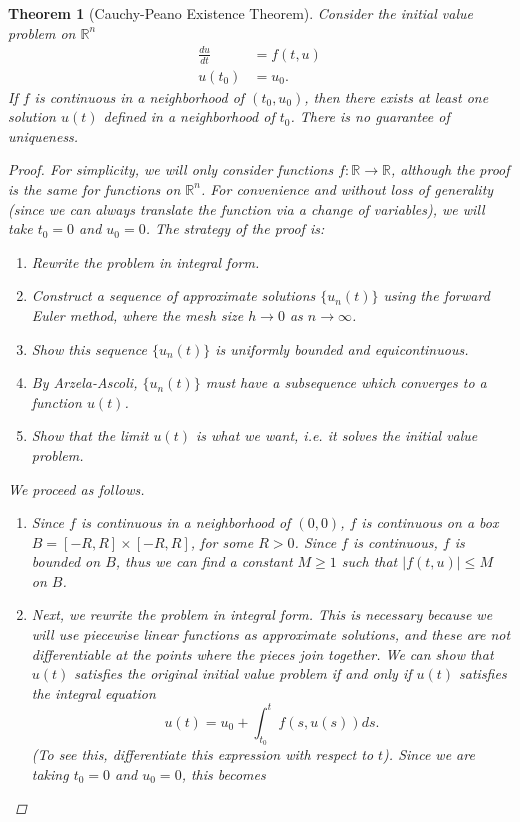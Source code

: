 \documentclass[12pt]{amsart}         %
\newtheorem{theorem}{Theorem}[section]
\theoremstyle{remark}
\newcommand{\R}{\mathbb{R}}
\begin{document}
\begin{theorem}[Cauchy-Peano Existence Theorem]
Consider the initial value problem on $\R^n$
\begin{align*}
\frac{du}{dt} &= f(t, u) \\
u(t_0) &= u_0.
\end{align*}
If $f$ is continuous in a neighborhood of $(t_0, u_0)$, then there exists at least one solution $u(t)$ defined in a neighborhood of $t_0$. There is no guarantee of uniqueness.
\begin{proof}
For simplicity, we will only consider functions $f: \R \rightarrow \R$, although the proof is the same for functions on $\R^n$. For convenience and without loss of generality (since we can always translate the function via a change of variables), we will take $t_0 = 0$ and $u_0 = 0$. The strategy of the proof is:
\begin{enumerate}
    \item Rewrite the problem in integral form.
	\item Construct a sequence of approximate solutions $\{ u_n(t) \}$ using the forward Euler method, where the mesh size $h \rightarrow 0$ as $n \rightarrow \infty$.
	\item Show this sequence $\{ u_n(t) \}$ is uniformly bounded and equicontinuous.
	\item By Arzela-Ascoli, $\{ u_n(t) \}$ must have a subsequence which converges to a function $u(t)$.
	\item Show that the limit $u(t)$ is what we want, i.e. it solves the initial value problem.
\end{enumerate}
We proceed as follows.
\begin{enumerate}
    \item Since $f$ is continuous in a neighborhood of $(0,0)$, $f$ is continuous on a box $B = [-R, R] \times [-R, R]$, for some $R > 0$. Since $f$ is continuous, $f$ is bounded on $B$, thus we can find a constant $M \geq 1$ such that $|f(t, u)| \leq M$ on $B$. 
    \item Next, we rewrite the problem in integral form. This is necessary because we will use piecewise linear functions as approximate solutions, and these are not differentiable at the points where the pieces join together. We can show that $u(t)$ satisfies the original initial value problem if and only if $u(t)$ satisfies the integral equation
    \[
    u(t) = u_0 + \int_{t_0}^t f(s, u(s))ds.
    \]
    (To see this, differentiate this expression with respect to $t$). Since we are taking $t_0 = 0$ and $u_0 = 0$, this becomes

\end{enumerate}
\end{proof}
\end{theorem}
\end{document}
